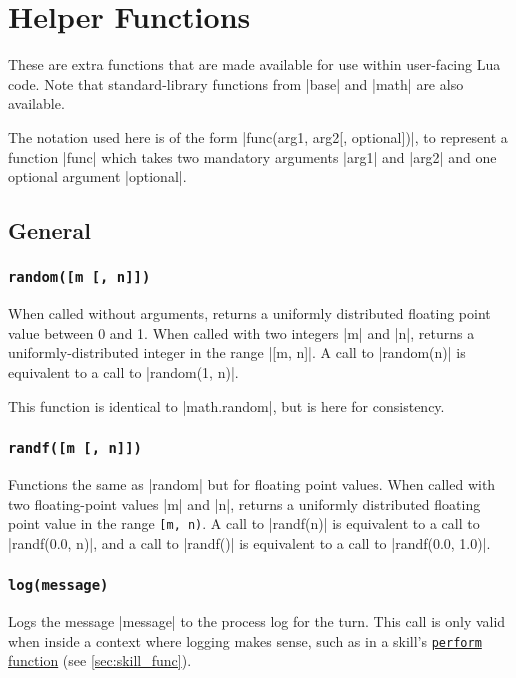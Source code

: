 \chapter{Helper Functions}
\label{ch:func}

These are extra functions that are made available for use
within user-facing Lua code.
Note that standard-library functions from |base| and |math| are also available.

The notation used here is of the form |func(arg1, arg2[, optional])|,
to represent a function |func|
which takes two mandatory arguments |arg1| and |arg2|
and one optional argument |optional|.

\section{General}
\label{sec:func_general}

\subsection{\lstinline{random([m [, n]])}}
\label{sec:func_general_random}

When called without arguments,
returns a uniformly distributed floating point value between 0 and 1.
When called with two integers |m| and |n|,
returns a uniformly-distributed integer in the range |[m, n]|.
A call to |random(n)| is equivalent to a call to |random(1, n)|.

This function is identical to |math.random|, but is here for consistency.

\subsection{\lstinline{randf([m [, n]])}}
\label{sec:func_general_randf}

Functions the same as |random| but for floating point values.
When called with two floating-point values |m| and |n|,
returns a uniformly distributed floating point value in the range \lstinline{[m, n)}.
A call to |randf(n)| is equivalent to a call to |randf(0.0, n)|,
and a call to |randf()| is equivalent to a call to |randf(0.0, 1.0)|.

\subsection{\lstinline{log(message)}}

Logs the message |message| to the process log for the turn.
This call is only valid when inside a context where logging makes sense,
such as in a skill's \hyperref[sec:skill_func]{\lstinline|perform| function}
(see \autoref{sec:skill_func}).

